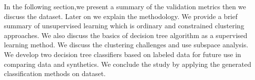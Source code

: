In the following section,we present a summary of the validation metrics then we discuss the dataset. Later on we explain the methodology. We provide a brief summary of unsupervised learning which is ordinary and constrained clustering approaches. We also discuss the basics of decision tree algorithm as a supervised learning method. We discuss the clustering challenges and use subspace analysis. We develop two decision tree classifiers based on labeled data for future use in comparing data and synthetics. We conclude the study by applying the generated classification methods on \citet{Taborda_2014_BSSA} dataset.




